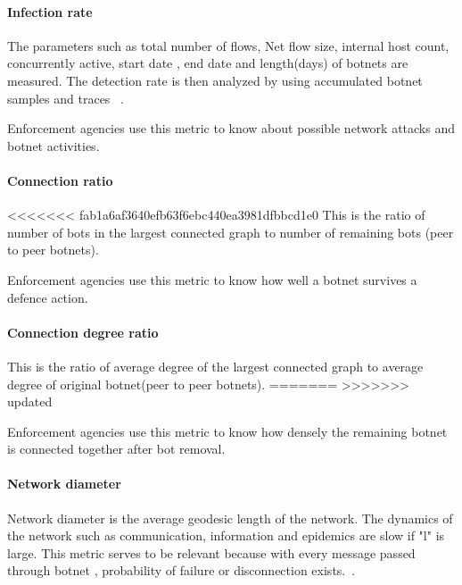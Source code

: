 

\paragraph{ Infection rate }

The  parameters such as total number of flows, Net flow size, internal host count, concurrently  active, start date , end date and length(days) of botnets are measured. The detection rate is then analyzed by using accumulated botnet samples and traces ~\cite{haltas2014automated}.

Enforcement agencies use this metric to know about possible network attacks and botnet activities.

\paragraph{ Connection ratio }

<<<<<<< fab1a6af3640efb63f6ebc440ea3981dfbbcd1e0
This is the ratio of number of bots in the largest connected graph to number of remaining bots (peer to peer botnets).

Enforcement agencies use this metric to know how well a botnet survives a defence action.

\paragraph{ Connection degree ratio }

This is the ratio of average degree of the largest connected graph to average degree of original botnet(peer to peer botnets).
=======
>>>>>>> updated

Enforcement agencies use this metric to know how densely the remaining botnet is connected together after bot removal.

\paragraph{ Network diameter }

Network diameter is the average geodesic length of the network.  The dynamics of the network such as communication, information and epidemics are slow if "l" is large. This metric serves to be relevant  because  with every message passed through botnet , probability of failure or disconnection exists.~\cite{Strayer08botnetdetection}.

